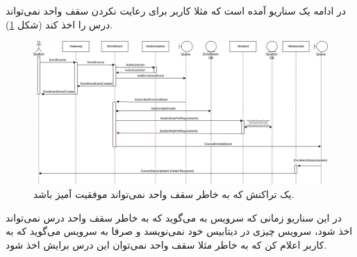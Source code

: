 در ادامه یک سناریو آمده است که مثلا کاربر برای رعایت نکردن سقف واحد نمی‌تواند درس را اخذ کند
(شکل
\ref{transaction:failed}).
\begin{figure}
    \centering
    \includegraphics[width=\textwidth,height=\textheight,keepaspectratio]{diagrams/Transaction-Failed.png}
    \caption{یک تراکنش که به خاطر سقف واحد نمی‌تواند موفقیت آمیز باشد.}
    \label{transaction:failed}
\end{figure}
در این سناریو زمانی که سرویس
به
می‌گوید که به خاطر سقف واحد درس نمی‌تواند اخذ شود، سرویس
چیزی در دیتابیس خود نمی‌نویسد و صرفا به سرویس
می‌گوید که به کاربر اعلام کن که به خاطر مثلا سقف واحد نمی‌توان این درس برایش اخذ شود.